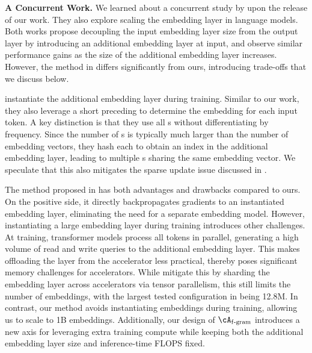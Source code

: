 \smallskip\noindent\textbf{A Concurrent Work.} We learned about a concurrent study by \citet{huang2025over} upon the release of our work. They also explore scaling the embedding layer in language models. Both works propose decoupling the input embedding layer size from the output layer by introducing an additional embedding layer at input, and observe similar performance gains as the size of the additional embedding layer increases. However, the method in \citet{huang2025over} differs significantly from ours, introducing trade-offs that we discuss below.

\citet{huang2025over} instantiate the additional embedding layer during training. Similar to our work, they also leverage a short preceding  to determine the embedding for each input token. A key distinction is that they use all s without differentiating by frequency. Since the number of s is typically much larger than the number of embedding vectors, they hash each  to obtain an index in the additional embedding layer, leading to multiple s sharing the same embedding vector. We speculate that this also mitigates the sparse update issue discussed in .

The method proposed in \citet{huang2025over} has both advantages and drawbacks compared to ours. On the positive side, it directly backpropagates gradients to an instantiated embedding layer, eliminating the need for a separate embedding model. However, instantiating a large embedding layer during training introduces other challenges. At training, transformer models process all tokens in parallel, generating a high volume of read and write queries to the additional embedding layer. This makes offloading the layer from the accelerator less practical, thereby poses significant memory challenges for accelerators. While \citet{huang2025over} mitigate this by sharding the embedding layer across accelerators via tensor parallelism, this still limits the number of embeddings, with the largest tested configuration in \citet{huang2025over} being 12.8M. In contrast, our method avoids instantiating embeddings during training, allowing us to scale to 1B embeddings. Additionally, our design of $\Afgram$ introduces a new axis for leveraging extra training compute while keeping both the additional embedding layer size and inference-time FLOPS fixed.
